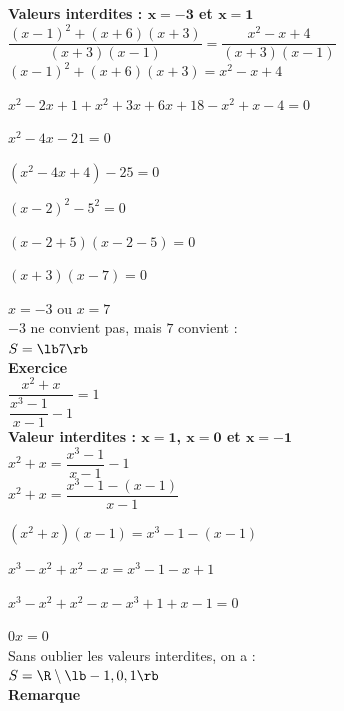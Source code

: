 \textbf{Valeurs interdites : $ \mathbf{x=-3} $ et $ \mathbf{x=1} $} \\

$ \dfrac{\left(x-1\right)^2+\left(x+6\right)\left(x+3\right)}{\left(x+3\right)\left(x-1\right)} = \dfrac{x^2-x+4}{\left(x+3\right)\left(x-1\right)} $ \\

$ \left(x-1\right)^2+\left(x+6\right)\left(x+3\right)= x^2-x+4 $ 

$ x^2 - 2x + 1 + x^2 + 3x + 6x + 18 - x^2 + x - 4 = 0 $

$ x^2 - 4x - 21 = 0 $

$ \left(x^2 - 4x + 4\right) - 25 = 0 $

$ \left(x-2\right)^2 - 5^2 = 0 $

$ \left(x-2+5\right)\left(x-2-5\right)=0 $

$ \left(x+3\right)\left(x-7\right) = 0 $

$ x = -3 $ ou $ x = 7 $ \\

$ -3 $ ne convient pas, mais $ 7 $ convient : \\

$ S = \lb 7 \rb $  \\

\textbf{Exercice } \\

$ \dfrac{x^2+x}{\dfrac{x^3-1}{x-1}-1} = 1 $ \\

\textbf{Valeur interdites : $ \mathbf{x = 1 }$, $ \mathbf{x = 0 }$ et $ \mathbf{x = -1 }$} \\

$ x^2 + x = \dfrac{x^3 - 1}{x-1} - 1 $ \\

$ x^2 + x = \dfrac{x^3-1-\left(x-1\right)}{x-1} $

$ \left(x^2+x\right)\left(x-1\right) = x^3 - 1 - \left(x-1\right) $

$ x^3 - x^2 + x^2 - x = x^3 - 1 - x + 1 $

$ x^3 - x^2 + x^2 - x - x^3 + 1 + x - 1 = 0 $

$ 0x = 0 $ \\

Sans oublier les valeurs interdites, on a : \\

$ S = \R \setminus \lb -1, 0, 1 \rb $ \\

\textbf{Remarque} \\

